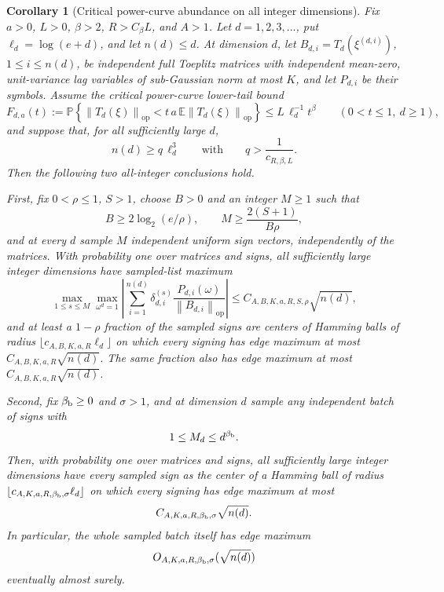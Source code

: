 \documentclass[11pt]{amsart}
\numberwithin{equation}{section}
\newtheorem{corollary}[theorem]{Corollary}
\theoremstyle{definition}
\theoremstyle{remark}
\newcommand{\op}{\mathrm{op}}
\newcommand{\Prob}{\mathbb P}
\newcommand{\Exp}{\mathbb E}
\newcommand{\norm}[1]{\left\lVert #1\right\rVert}
\begin{document}
\begin{corollary}[Critical power-curve abundance on all integer dimensions]
\label{cor:normalizer-tail-power-borel-critical-integers}
Fix \(a>0\), \(L>0\), \(\beta>2\), \(R>C_\beta L\), and \(A>1\).  Let
\(d=1,2,3,\ldots\), put \(\ell_d=\log(e+d)\), and let \(n(d)\le d\).  At
dimension \(d\), let
\(B_{d,i}=T_d(\xi^{(d,i)})\), \(1\le i\le n(d)\), be independent full Toeplitz
matrices with independent mean-zero, unit-variance lag variables of
sub-Gaussian norm at most \(K\), and let \(P_{d,i}\) be their symbols.  Assume
the critical power-curve lower-tail bound
\[
  F_{d,a}(t):=
  \Prob\left\{\norm{T_d(\xi)}_{\op}
  <t\,a\,\Exp\norm{T_d(\xi)}_{\op}\right\}
  \le L\,\ell_d^{-1}t^\beta
  \qquad(0<t\le1,\ d\ge1),
\]
and suppose that, for all sufficiently large \(d\),
\[
  n(d)\ge q\,\ell_d^3
  \qquad\text{with}\qquad
  q>\frac1{c_{R,\beta,L}}.
\]
Then the following two all-integer conclusions hold.

First, fix \(0<\rho\le1\), \(S>1\), choose \(B>0\) and an integer \(M\ge1\)
such that
\[
  B\ge 2\log_2(e/\rho),
  \qquad
  M\ge \frac{2(S+1)}{B\rho},
\]
and at every \(d\) sample \(M\) independent uniform sign vectors, independently
of the matrices.  With probability one over matrices and signs, all sufficiently
large integer dimensions have sampled-list maximum
\[
  \max_{1\le s\le M}\max_{\omega^d=1}
  \left|\sum_{i=1}^{n(d)}\delta_{d,i}^{(s)}
  \frac{P_{d,i}(\omega)}{\norm{B_{d,i}}_{\op}}\right|
  \le C_{A,B,K,a,R,S,\rho}\sqrt{n(d)},
\]
and at least a \(1-\rho\) fraction of the sampled signs are centers of Hamming
balls of radius \(\lfloor c_{A,B,K,a,R}\ell_d\rfloor\) on which every signing
has edge maximum at most \(C_{A,B,K,a,R}\sqrt{n(d)}\).  The same fraction also
has edge maximum at most \(C_{A,B,K,a,R}\sqrt{n(d)}\).

Second, fix \(\beta_{\rm b}\ge0\) and \(\sigma>1\), and at dimension \(d\)
sample any independent batch of signs with
\[
  1\le M_d\le d^{\beta_{\rm b}} .
\]
Then, with probability one over matrices and signs, all sufficiently large
integer dimensions have every sampled sign as the center of a Hamming ball of
radius \(\lfloor c_{A,K,a,R,\beta_{\rm b},\sigma}\ell_d\rfloor\) on which every
signing has edge maximum at most
\[
  C_{A,K,a,R,\beta_{\rm b},\sigma}\sqrt{n(d)}.
\]
In particular, the whole sampled batch itself has edge maximum
\[
  O_{A,K,a,R,\beta_{\rm b},\sigma}(\sqrt{n(d)})
\]
eventually almost surely.
\end{corollary}
\end{document}
